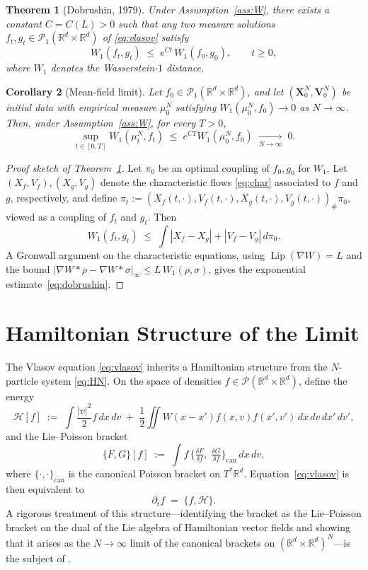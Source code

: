 \documentclass[11pt]{article}
\newtheorem{theorem}{Theorem}
\newtheorem{corollary}[theorem]{Corollary}
\theoremstyle{definition}
\theoremstyle{remark}
\newcommand{\R}{\mathbb{R}}
\newcommand{\X}{\mathbf{X}}
\newcommand{\V}{\mathbf{V}}
\DeclareMathOperator{\Lip}{Lip}
\begin{document}
\begin{theorem}[Dobrushin, 1979]\label{thm:dobrushin}
Under Assumption~\ref{ass:W}, there exists a constant $C = C(L) > 0$ such that any two
measure solutions $f_t, g_t \in \mathcal{P}_1(\R^d \times \R^d)$ of \eqref{eq:vlasov} satisfy
\begin{equation}
  W_1(f_t, g_t) \;\le\; e^{C t} \, W_1(f_0, g_0), \qquad t \ge 0,
  \label{eq:dobrushin}
\end{equation}
where $W_1$ denotes the Wasserstein-$1$ distance.
\end{theorem}

\begin{corollary}[Mean-field limit]\label{cor:mfl}
Let $f_0 \in \mathcal{P}_1(\R^d \times \R^d)$, and let $(\X_0^N, \V_0^N)$ be initial data with
empirical measure $\mu_0^N$ satisfying $W_1(\mu_0^N, f_0) \to 0$ as $N \to \infty$. Then,
under Assumption~\ref{ass:W}, for every $T > 0$,
\[
  \sup_{t \in [0,T]} W_1(\mu_t^N, f_t) \;\le\; e^{CT} W_1(\mu_0^N, f_0) \;\xrightarrow[N \to \infty]{}\; 0.
\]
\end{corollary}

\begin{proof}[Proof sketch of Theorem~\ref{thm:dobrushin}]
Let $\pi_0$ be an optimal coupling of $f_0, g_0$ for $W_1$. Let $(X_f, V_f), (X_g, V_g)$ denote the
characteristic flows \eqref{eq:char} associated to $f$ and $g$, respectively, and define
$\pi_t := (X_f(t,\cdot), V_f(t,\cdot), X_g(t,\cdot), V_g(t,\cdot))_\# \pi_0$, viewed as a coupling
of $f_t$ and $g_t$. Then
\[
  W_1(f_t, g_t) \;\le\; \int |X_f - X_g| + |V_f - V_g| \, d\pi_0.
\]
A Gronwall argument on the characteristic equations, using $\Lip(\nabla W) = L$ and the
bound $|\nabla W * \rho - \nabla W * \sigma|_\infty \le L \, W_1(\rho, \sigma)$, gives
the exponential estimate~\eqref{eq:dobrushin}.
\end{proof}

\section{Hamiltonian Structure of the Limit}

The Vlasov equation \eqref{eq:vlasov} inherits a Hamiltonian structure from the $N$-particle
system \eqref{eq:HN}. On the space of densities $f \in \mathcal{P}(\R^d \times \R^d)$,
define the energy
\[
  \mathcal{H}[f] \;:=\; \int \frac{|v|^2}{2} f \, dx\, dv \;+\; \frac{1}{2}
  \iint W(x - x') f(x, v) f(x', v') \, dx \, dv \, dx' \, dv',
\]
and the Lie--Poisson bracket
\[
  \{F, G\}[f] \;:=\; \int f \, \big\{ \tfrac{\delta F}{\delta f},\; \tfrac{\delta G}{\delta f} \big\}_{\mathrm{can}} \, dx\, dv,
\]
where $\{\cdot, \cdot\}_{\mathrm{can}}$ is the canonical Poisson bracket on $T^* \R^d$.
Equation~\eqref{eq:vlasov} is then equivalent to
\[
  \partial_t f \;=\; \{f, \mathcal{H}\}.
\]
A rigorous treatment of this structure---identifying the bracket as the Lie--Poisson bracket
on the dual of the Lie algebra of Hamiltonian vector fields and showing that it arises as
the $N \to \infty$ limit of the canonical brackets on $(\R^d \times \R^d)^N$---is the subject
of \cite{MNPRS}.
\end{document}
